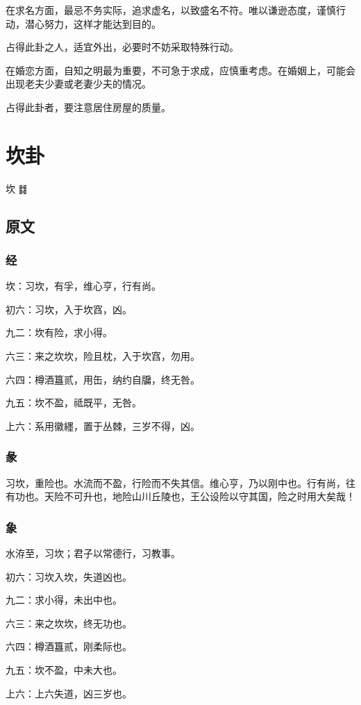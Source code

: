 \documentclass[12pt,oneside]{book}
\begin{document}
在求名方面，最忌不务实际，追求虚名，以致盛名不符。唯以谦逊态度，谨慎行动，潜心努力，这样才能达到目的。

占得此卦之人，适宜外出，必要时不妨采取特殊行动。

在婚恋方面，自知之明最为重要，不可急于求成，应慎重考虑。在婚姻上，可能会出现老夫少妻或老妻少夫的情况。

占得此卦者，要注意居住房屋的质量。


\chapter{坎卦}
坎 {\Large ䷜}

\section{原文}

\subsection{经}
坎：习坎，有孚，维心亨，行有尚。

初六：习坎，入于坎窞，凶。

九二：坎有险，求小得。

六三：来之坎坎，险且枕，入于坎窞，勿用。

六四：樽酒簋贰，用缶，纳约自牖，终无咎。

九五：坎不盈，祗既平，无咎。

上六：系用徽纆，置于丛棘，三岁不得，凶。

\subsection{彖}
习坎，重险也。水流而不盈，行险而不失其信。维心亨，乃以刚中也。行有尚，往有功也。天险不可升也，地险山川丘陵也，王公设险以守其国，险之时用大矣哉！

\subsection{象}
水洊至，习坎；君子以常德行，习教事。

初六：习坎入坎，失道凶也。

九二：求小得，未出中也。

六三：来之坎坎，终无功也。

六四：樽酒簋贰，刚柔际也。

九五：坎不盈，中未大也。

上六：上六失道，凶三岁也。
\end{document}
